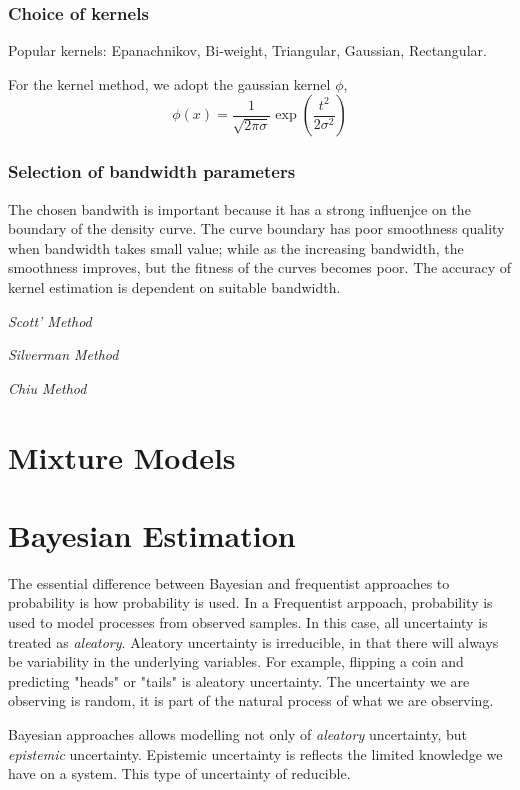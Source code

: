\subsubsection{Choice of kernels}
Popular kernels: Epanachnikov, Bi-weight, Triangular, Gaussian, Rectangular.

For the kernel method, we adopt the gaussian kernel $\phi$,
\begin{equation}
  \phi(x)=\frac{1}{\sqrt{2\pi\sigma}}\exp{\left(\frac{t^2}{2\sigma^2}\right)}
\end{equation}
\subsubsection{Selection of bandwidth parameters}
The chosen bandwith is important because it has a strong influenjce on the boundary of the density curve.  The curve boundary has poor smoothness quality when bandwidth takes small value; while as the increasing bandwidth, the smoothness improves, but the fitness of the curves becomes poor.  The accuracy of kernel estimation is dependent on suitable bandwidth.

\emph{Scott' Method}

\emph{Silverman Method}

\emph{Chiu Method}

\section{Mixture Models}

\section{Bayesian Estimation}
The essential difference between Bayesian and frequentist approaches to probability is how probability is used.  In a Frequentist arppoach, probability is used to model processes from observed samples.  In this case, all uncertainty is treated as \emph{aleatory}.  Aleatory uncertainty is irreducible, in that there will always be variability in the underlying variables.  For example, flipping a coin and predicting "heads" or "tails" is aleatory uncertainty.  The uncertainty we are observing is random, it is part of the natural process of what we are observing.

Bayesian approaches allows modelling not only of \emph{aleatory} uncertainty, but \emph{epistemic} uncertainty.  Epistemic uncertainty is reflects the limited knowledge we have on a system.   This type of uncertainty of reducible.

